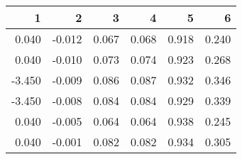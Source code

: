 \begin{table}[ht]
\centering
\begin{tabular}{rrrrrr}
  \hline
1 & 2 & 3 & 4 & 5 & 6 \\ 
  \hline
0.040 & -0.012 & 0.067 & 0.068 & 0.918 & 0.240 \\ 
  0.040 & -0.010 & 0.073 & 0.074 & 0.923 & 0.268 \\ 
  -3.450 & -0.009 & 0.086 & 0.087 & 0.932 & 0.346 \\ 
  -3.450 & -0.008 & 0.084 & 0.084 & 0.929 & 0.339 \\ 
  0.040 & -0.005 & 0.064 & 0.064 & 0.938 & 0.245 \\ 
  0.040 & -0.001 & 0.082 & 0.082 & 0.934 & 0.305 \\ 
   \hline
\end{tabular}
\end{table}
